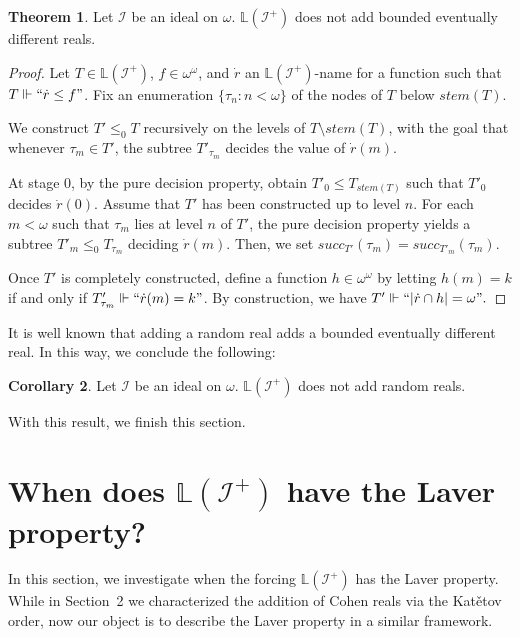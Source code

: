 \documentclass{amsart}
\theoremstyle{definition}
\newtheorem{theorem}{Theorem}[section]
\newtheorem{coro}[theorem]{Corollary}
\theoremstyle{remark}
\numberwithin{equation}{section}
\newcommand{\li}{\mathbb{L}(\mathcal{I}^+)}
\newcommand{\id}{\mathcal{I}}
\begin{document}
\begin{theorem}\label{bed}
    Let $\id$ be an ideal on $\omega$. $\li$ does not add bounded eventually different reals.
\end{theorem}
\begin{proof}
Let $T \in \li$, $f \in \omega^\omega$, and $\dot{r}$ an $\li$-name for a function such that 
$T \Vdash ``\dot{r} \leq f"$. Fix an enumeration $\{\tau_n : n < \omega\}$ of the nodes of $T$ below $stem(T)$.

We construct $T' \leq_0 T$ recursively on the levels of $T \setminus stem(T)$, 
with the goal that whenever $\tau_m \in T'$, the subtree $T'_{\tau_m}$ decides the value of $\dot{r}(m)$. 

At stage $0$, by the pure decision property, obtain $T'_0 \leq T_{stem(T)}$ such that $T'_0$ decides $\dot{r}(0)$. 
Assume that $T'$ has been constructed up to level $n$. 
For each $m < \omega$ such that $\tau_m$ lies at level $n$ of $T'$, 
the pure decision property yields a subtree $T'_m \leq_0 T_{\tau_m}$ deciding $\dot{r}(m)$. 
Then, we set $succ_{T'}(\tau_m) = succ_{T'_m}(\tau_m)$.

Once $T'$ is completely constructed, define a function $h \in \omega^\omega$ by letting $h(m) = k$ 
if and only if $T'_{\tau_m} \Vdash ``\dot{r}(m) = k"$. 
By construction, we have $T' \Vdash ``|\dot{r} \cap h| = \omega".$
\end{proof}

It is well known that adding a random real adds a bounded eventually different real.
In this way, we conclude the following:

\begin{coro}
    Let $\id$ be an ideal on $\omega$. $\li$ does not add random reals.
\end{coro}

With this result, we finish this section.

\section{When does $\li$ have the Laver property?}

In this section, we investigate when the forcing $\mathbb{L}(\mathcal{I}^+)$ has the Laver property. While in Section~2 we characterized the addition of Cohen reals via the Kat\v{e}tov order, now our object is to describe the Laver property in a similar framework.%
\end{document}
